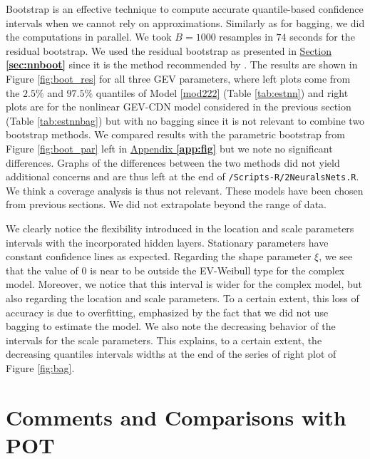  Bootstrap is an effective technique to compute accurate quantile-based confidence intervals when we cannot rely on approximations.
Similarly as for bagging, we did the computations in parallel. 
We took $B= 1000$ resamples in $74$ seconds for the residual bootstrap.
We used the residual bootstrap as presented in \hyperref[sec:nnboot]{Section \textbf{\ref{sec:nnboot}}} 
since it is the method recommended by \citet{kharin_estimating_2005}. The results are shown in Figure \ref{fig:boot_res} for all three GEV parameters, where left plots come from the $2.5\%$ and $97.5\%$ quantiles of Model \ref{mod222} (Table \ref{tab:estnn}) and right plots are for the nonlinear GEV-CDN model considered in the previous section (Table \ref{tab:estnnbag}) but with no bagging since it is not relevant to combine two bootstrap methods. We compared results with the parametric bootstrap from Figure \ref{fig:boot_par} left in \hyperref[app:fig]{Appendix \textbf{\ref{app:fig}}} but we note no significant differences. Graphs of the differences between the two methods did not yield additional concerns and are thus left at the end of \texttt{/Scripts-R/2NeuralsNets.R}. We think a coverage analysis is thus not relevant.
 These models have been chosen from previous sections. 
We did not extrapolate beyond the range of data.
 
 We clearly notice the flexibility introduced in the location and scale parameters intervals with the incorporated hidden layers. Stationary parameters have constant confidence lines as expected.
 Regarding the shape parameter $\xi$, we see that the value of $0$ is near to be outside the EV-Weibull type for the complex model. Moreover, we notice that this interval is wider for the complex model, but also regarding the location and scale parameters. To a certain extent, this loss of accuracy is due to overfitting, emphasized by the fact that we did not use bagging to estimate the model. We also note the decreasing behavior of the intervals for the scale parameters. This explains, to a certain extent, the decreasing quantiles intervals widths at the end of the series of right plot of Figure \ref{fig:bag}.

  
 
 
\section{Comments and Comparisons with POT}


